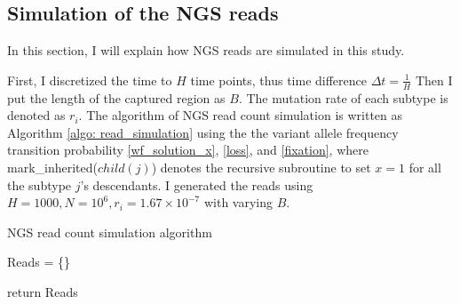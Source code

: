 \documentclass{article}
\begin{document}
\subsection{Simulation of the NGS reads}
In this section, I will explain how NGS reads are simulated in this study.

First, I discretized the time to $H$ time points, thus time difference $\varDelta t = \frac{1}{H}$
Then I put the length of the captured region as $B$. The mutation rate of each subtype is denoted as $r_i$.
The algorithm of NGS read count simulation is written as Algorithm \ref{algo: read_simulation} using the the variant allele frequency transition probability \eqref{wf_solution_x}, \eqref{loss}, and \eqref{fixation}, where mark\_inherited($child(j)$) denotes the recursive subroutine to set $x = 1$ for all the subtype $j$'s descendants.
I generated the reads using $H=1000, N=10^6, r_i = 1.67\times 10^{-7}$ with varying $B$.

 \begin{algorithm}[H]
  \caption{NGS read count simulation algorithm}
  \label{algo: read_simulation}
  Reads = \{\}
  
  return Reads
\end{algorithm}
  
\end{document}
